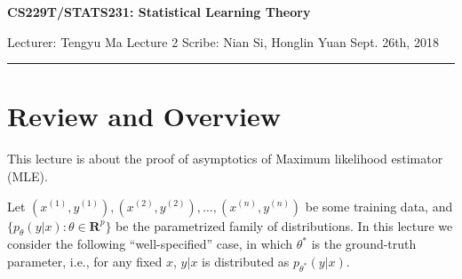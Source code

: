 \documentclass[11pt,letterpaper]{article}
\newcommand{\real}{\mathbf{R}}
\theoremstyle{definition}
\begin{document}
\thispagestyle{empty}


\begin{center}
\textbf{\large CS229T/STATS231: Statistical Learning Theory }
\end{center}

\noindent Lecturer: Tengyu Ma %
\hfill Lecture 2 %
\newline
Scribe: Nian Si, Honglin Yuan %
\hfill Sept. 26th, 2018 %

\noindent \rule{\textwidth}{1pt}

\medskip


\section{Review and Overview}
This lecture is about the proof of asymptotics of Maximum likelihood estimator (MLE).

Let $(x^{(1)}, y^{(1)}), (x^{(2)}, y^{(2)}), \ldots, (x^{(n)}, y^{(n)})$ be some training data, and $\{p_{\theta}(y|x): \theta \in \real^p\}$ be the parametrized family of distributions. In this lecture we consider the following ``well-specified'' case, in which $\theta^*$ is the ground-truth parameter, i.e., for any fixed $x$, $y|x$ is distributed as $p_{\theta^*} (y|x)$. 
\end{document}
